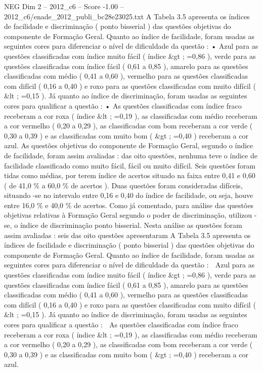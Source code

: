 \begin{textsample}{NEG Dim 2 – 2012\_c6 – Score -1.00 – 2012\_c6/enade\_2012\_publi\_bc28e23025.txt}
A Tabela 3.5 apresenta os índices de facilidade e discriminação ( ponto bisserial ) das questões objetivas do componente de Formação Geral.
Quanto ao índice de facilidade, foram usadas as seguintes cores para diferenciar o nível de dificuldade da questão : • Azul para as questões classificadas com índice muito fácil ( índice \&gt ; =0,86 ), verde para as questões classificadas com índice fácil ( 0,61 a 0,85 ), amarelo para as questões classificadas com médio ( 0,41 a 0,60 ), vermelho para as questões classificadas com difícil ( 0,16 a 0,40 ) e roxo para as questões classificadas com muito difícil ( \&lt ; =0,15 ).
Já quanto ao índice de discriminação, foram usadas as seguintes cores para qualificar a questão : • As questões classificadas com índice fraco receberam a cor roxa ( índice \&lt ; =0,19 ), as classificadas com médio receberam a cor vermelho ( 0,20 a 0,29 ), as classificadas com bom receberam a cor verde ( 0,30 a 0,39 ) e as classificadas com muito bom ( \&gt ; =0,40 ) receberam a cor azul.
As questões objetivas do componente de Formação Geral, segundo o índice de facilidade, foram assim avaliadas : das oito questões, nenhuma teve o índice de facilidade classificado como muito fácil, fácil ou muito difícil.
Seis questões foram tidas como médias, por terem índice de acertos situado na faixa entre 0,41 e 0,60 ( de 41,0 \% a 60,0 \% de acertos ).
Duas questões foram consideradas difíceis, situando -se no intervalo entre 0,16 e 0,40 do índice de facilidade, ou seja, houve entre 16,0 \% e 40,0 \% de acertos.
Como já comentado, para análise das questões objetivas relativas à Formação Geral segundo o poder de discriminação, utilizou -se, o índice de discriminação ponto bisserial.
Nesta análise as questões foram assim avaliadas : seis das oito questões apresentaram A Tabela 3.5 apresenta os índices de facilidade e discriminação ( ponto bisserial ) das questões objetivas do componente de Formação Geral.
Quanto ao índice de facilidade, foram usadas as seguintes cores para diferenciar o nível de dificuldade da questão :  Azul para as questões classificadas com índice muito fácil ( índice \&gt ; =0,86 ), verde para as questões classificadas com índice fácil ( 0,61 a 0,85 ), amarelo para as questões classificadas com médio ( 0,41 a 0,60 ), vermelho para as questões classificadas com difícil ( 0,16 a 0,40 ) e roxo para as questões classificadas com muito difícil ( \&lt ; =0,15 ).
Já quanto ao índice de discriminação, foram usadas as seguintes cores para qualificar a questão :  As questões classificadas com índice fraco receberam a cor roxa ( índice \&lt ; =0,19 ), as classificadas com médio receberam a cor vermelho ( 0,20 a 0,29 ), as classificadas com bom receberam a cor verde ( 0,30 a 0,39 ) e as classificadas com muito bom ( \&gt ; =0,40 ) receberam a cor azul.

\end{textsample}
